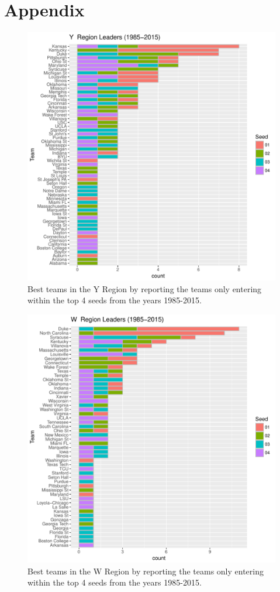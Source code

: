 \documentclass[]{scrartcl}
\begin{document}
\section*{Appendix}
\begin{figure}[H]
	\centering
	\includegraphics[scale=.75]{YConfLeader.pdf}
	\caption[leaders]{Best teams in the Y Region by reporting the teams only entering within the top 4 seeds from the years 1985-2015. }
	\label{rVals}
\end{figure}

\begin{figure}[H]
	\centering
	\includegraphics[scale=.75]{WConfLeader.pdf}
	\caption[leaders]{Best teams in the W Region by reporting the teams only entering within the top 4 seeds from the years 1985-2015. }
	\label{rVals}
\end{figure}
\end{document}
